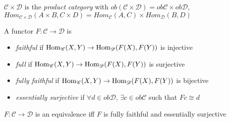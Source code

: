 \documentclass[main]{subfiles}
\begin{document}
\begin{definition}
$\mathscr C\times\mathscr D$  is the \textit{product category} with $ob(\mathscr C\times\mathscr D)=ob\mathscr C\times ob\mathscr D$, $Hom_{\mathscr C\times\mathscr D}(A\times B,C\times D)=Hom_{\mathscr C}(A,C)\times Hom_{\mathscr D}(B,D)$
\end{definition}

\begin{definition}
A functor $F:\mathscr C\to\mathscr D$ is
\begin{itemize}
\item \textit{faithful} if $\operatorname{Hom}_{\mathscr C}(X,Y)\to \operatorname{Hom}_{\mathscr D}(F(X),F(Y))$ is injective
\item \textit{full} if $\operatorname{Hom}_{\mathscr C}(X,Y)\to \operatorname{Hom}_{\mathscr D}(F(X),F(Y))$ is surjective
\item \textit{fully faithful} if $\operatorname{Hom}_{\mathscr C}(X,Y)\to \operatorname{Hom}_{\mathscr D}(F(X),F(Y))$ is bijective
\item \textit{essentially surjective} if $\forall d\in ob\mathscr D$, $\exists c\in ob\mathscr C$ such that $Fc\cong d$
\end{itemize}
\end{definition}

\begin{theorem}\label{A functor F is an equivalence iff it is fully faithful and essentially surjective}
$F:\mathscr C\to\mathscr D$ is an equivalence iff $F$ is fully faithful and essentially surjective
\end{theorem}
\end{document}
